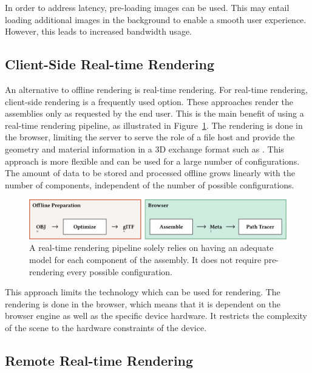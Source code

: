 In order to address latency, pre-loading images can be used. This may entail loading additional images in the background to enable a smooth user experience. However, this leads to increased bandwidth usage.

\subsection*{Client-Side Real-time Rendering}

An alternative to offline rendering is real-time rendering. For real-time rendering, client-side rendering is a frequently  used option. These approaches render the assemblies only as requested by the end user. This is the main benefit of using a real-time rendering pipeline, as illustrated in Figure~\ref{fig:cad-online}. The rendering is done in the browser, limiting the server to serve the role of a file host and provide the geometry and material information in a 3D exchange format such as . This approach is more flexible and can be used for a large number of configurations. The amount of data to be stored and processed offline grows linearly with the number of components, independent of the number of possible configurations.

\begin{figure}[H]
  \includegraphics[width=\columnwidth]{resources/cad-pipeline-online.png}
  \caption{A real-time rendering pipeline solely relies on having an adequate model for each component of the assembly. It does not require pre-rendering every possible configuration.}
  \label{fig:cad-online}
\end{figure}

This approach limits the technology which can be used for rendering. The rendering is done in the browser, which means that it is dependent on the browser engine as well as the specific device hardware. It restricts the complexity of the scene to the hardware constraints of the device.

\subsection*{Remote Real-time Rendering}

